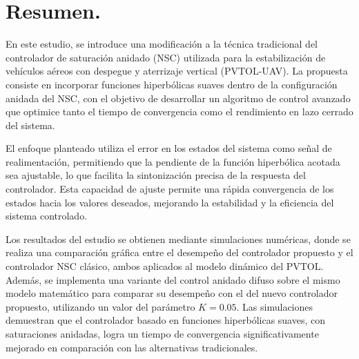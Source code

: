 \section*{Resumen.}

En este estudio, se introduce una modificación a la técnica tradicional del controlador de saturación anidado (NSC) utilizada para la estabilización de vehículos aéreos con despegue y aterrizaje vertical (PVTOL-UAV). La propuesta consiste en incorporar funciones hiperbólicas suaves dentro de la configuración anidada del NSC, con el objetivo de desarrollar un algoritmo de control avanzado que optimice tanto el tiempo de convergencia como el rendimiento en lazo cerrado del sistema. 

El enfoque planteado utiliza el error en los estados del sistema como señal de realimentación, permitiendo que la pendiente de la función hiperbólica acotada sea ajustable, lo que facilita la sintonización precisa de la respuesta del controlador. Esta capacidad de ajuste permite una rápida convergencia de los estados hacia los valores deseados, mejorando la estabilidad y la eficiencia del sistema controlado.

Los resultados del estudio se obtienen mediante simulaciones numéricas, donde se realiza una comparación gráfica entre el desempeño del controlador propuesto y el controlador NSC clásico, ambos aplicados al modelo dinámico del PVTOL. Además, se implementa una variante del control anidado difuso sobre el mismo modelo matemático para comparar su desempeño con el del nuevo controlador propuesto, utilizando un valor del parámetro $K = 0.05$. Las simulaciones demuestran que el controlador basado en funciones hiperbólicas suaves, con saturaciones anidadas, logra un tiempo de convergencia significativamente mejorado en comparación con las alternativas tradicionales.


